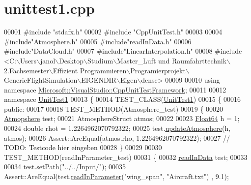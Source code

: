 \hypertarget{unittest1_8cpp_source}{}\section{unittest1.\+cpp}
\label{unittest1_8cpp_source}

\begin{DoxyCode}
00001 \textcolor{preprocessor}{#include "stdafx.h"}
00002 \textcolor{preprocessor}{#include "CppUnitTest.h"}
00003 
00004 \textcolor{preprocessor}{#include"Atmosphere.h"}
00005 \textcolor{preprocessor}{#include"readInData.h"}
00006 \textcolor{preprocessor}{#include"DataCloud.h"}
00007 \textcolor{preprocessor}{#include"LinearInterpolation.h"}
00008 \textcolor{preprocessor}{#include <C:\(\backslash\)Users\(\backslash\)janol\(\backslash\)Desktop\(\backslash\)Studium\(\backslash\)Master\_Luft und Raumfahrttechnik\(\backslash\)2.Fachsemester\(\backslash\)Effizient
       Programmieren\(\backslash\)Programierprojekt\(\backslash\)GenericFlightSimulation\(\backslash\)EIGENDIR\(\backslash\)Eigen\(\backslash\)dense>}
00009 
00010 \textcolor{keyword}{using namespace }\hyperlink{namespace_microsoft_1_1_visual_studio_1_1_cpp_unit_test_framework}{Microsoft::VisualStudio::CppUnitTestFramework};
00011 
00012 \textcolor{keyword}{namespace }\hyperlink{namespace_unit_test1}{UnitTest1}
00013 \{       
00014     TEST\_CLASS(\hyperlink{namespace_unit_test1}{UnitTest1})
00015     \{
00016     \textcolor{keyword}{public}:
00017         
00018         TEST\_METHOD(Atmosphere\_test)
00019         \{
00020             \hyperlink{group___atmosphere_class_atmopshere}{Atmopshere} test;
00021             AtmosphereStruct atmos;
00022             
00023             \hyperlink{group___tools_ga3f1431cb9f76da10f59246d1d743dc2c}{Float64} h = 1;
00024             \textcolor{keywordtype}{double} rhot = 1.2264962070792322;
00025             test.\hyperlink{group___atmosphere_a2bd97471d32725d6196ee6816ea36c99}{updateAtmosphere}(h, atmos);
00026             Assert::AreEqual(atmos.rho, 1.2264962070792322);
00027             \textcolor{comment}{// TODO: Testcode hier eingeben}
00028         \}
00029 
00030         TEST\_METHOD(readInParameter\_test)
00031         \{
00032             \hyperlink{classread_in_data}{readInData} test;
00033             
00034             test.\hyperlink{classread_in_data_ad67d566fd837f6d721db279144d484e0}{setPath}(\textcolor{stringliteral}{"../../Input/"});
00035             Assert::AreEqual(test.\hyperlink{classread_in_data_a9ae979e74958b43424cb6cf4a22043d7}{readInParameter}(\textcolor{stringliteral}{"wing\_span"}, \textcolor{stringliteral}{"Aircraft.txt"}) , 9.1);

\end{DoxyCode}
